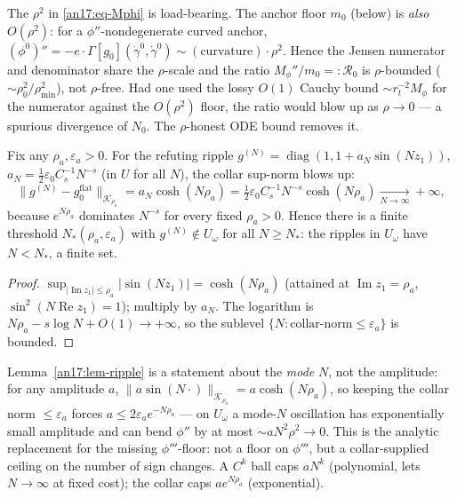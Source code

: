 \begin{remark}
\label{an17:rem-rho2}
The $\rho^2$ in \eqref{an17:eq-Mphi} is load-bearing. The anchor floor $m_0$
(below) is \emph{also} $O(\rho^2)$: for a $\phi''$-nondegenerate curved anchor,
$(\phi^0)''=-e\cdot\Gamma[g_0](\dot\gamma^0,\dot\gamma^0)\sim(\text{curvature})
\cdot\rho^2$. Hence the Jensen numerator and denominator share the $\rho$-scale
and the ratio $M_\phi''/m_0=:\mathcal R_0$ is $\rho$-bounded ($\sim\rho_0^2/
\rho_{\min}^2$), not $\rho$-free. Had one used the lossy $O(1)$ Cauchy bound
$\sim r_t^{-2}M_\phi$ for the numerator against the $O(\rho^2)$ floor, the ratio
would blow up as $\rho\to0$ --- a spurious divergence of $N_0$. The $\rho$-honest
ODE bound removes it.
\end{remark}

\begin{lemma}\label{an17:lem-ripple}
Fix any $\rho_a,\varepsilon_a>0$. For the refuting ripple $g^{(N)}=\operatorname
{diag}(1,1+a_N\sin(Nz_1))$, $a_N=\tfrac12\varepsilon_0 C_s^{-1}N^{-s}$ (in $U$
for all $N$), the collar sup-norm blows up:
\begin{equation}\label{an17:eq-ripple}
 \|g^{(N)}-g_0^{\mathrm{flat}}\|_{\mathcal K_{\rho_a}}=a_N\cosh(N\rho_a)
 =\tfrac12\varepsilon_0 C_s^{-1}N^{-s}\cosh(N\rho_a)\xrightarrow[N\to\infty]{}
 +\infty,
\end{equation}
because $e^{N\rho_a}$ dominates $N^{-s}$ for every fixed $\rho_a>0$. Hence there
is a finite threshold $N_*(\rho_a,\varepsilon_a)$ with $g^{(N)}\notin U_\omega$
for all $N\ge N_*$: the ripples in $U_\omega$ have $N<N_*$, a finite set.
\end{lemma}
\begin{proof}
$\sup_{|\operatorname{Im}z_1|\le\rho_a}|\sin(Nz_1)|=\cosh(N\rho_a)$ (attained at
$\operatorname{Im}z_1=\rho_a$, $\sin^2(N\operatorname{Re}z_1)=1$); multiply by
$a_N$. The logarithm is $N\rho_a-s\log N+O(1)\to+\infty$, so the sublevel
$\{N:\text{collar-norm}\le\varepsilon_a\}$ is bounded.
\end{proof}

\begin{remark}
\label{an17:rem-exclusion}
Lemma~\ref{an17:lem-ripple} is a statement about the \emph{mode} $N$, not the
amplitude: for any amplitude $a$, $\|a\sin(N\cdot)\|_{\mathcal K_{\rho_a}}=
a\cosh(N\rho_a)$, so keeping the collar norm $\le\varepsilon_a$ forces
$a\le2\varepsilon_a e^{-N\rho_a}$ --- on $U_\omega$ a mode-$N$ oscillation has
exponentially small amplitude and can bend $\phi''$ by at most $\sim aN^2\rho^2
\to0$. This is the analytic replacement for the missing $\phi'''$-floor: not a
floor on $\phi'''$, but a collar-supplied ceiling on the number of sign changes.
A $C^k$ ball caps $aN^k$ (polynomial, lets $N\to\infty$ at fixed cost); the
collar caps $ae^{N\rho_a}$ (exponential).
\end{remark}

